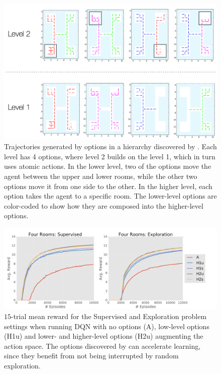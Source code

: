 \begin{figure}[ht!]
    \centering
    \includegraphics[width=\columnwidth]{ddco-experiments/ddo-4-rooms-results.png}
    \caption{Trajectories generated by options in a hierarchy discovered by \alg. Each level has 4 options, where level 2 builds on the level 1, which in turn uses atomic actions. In the lower level, two of the options move the agent between the upper and lower rooms, while the other two options move it from one side to the other. 
    In the higher level, each option takes the agent to a specific room. The lower-level options are color-coded to show how they are composed into the higher-level options. \label{gw-1}} 
\end{figure}

\begin{figure}[ht!]
    \centering
    \includegraphics[width=\columnwidth]{ddco-experiments/4-rooms-clean.png}
    \caption{$15$-trial mean reward for the Supervised and Exploration problem settings when running DQN with no options (\textsf{A}), low-level options (\textsf{H1u}) and lower- and higher-level options (\textsf{H2u}) augmenting the action space. The options discovered by \alg can accelerate learning, since they benefit from not being interrupted by random exploration.  \label{gw-2}}
\end{figure}


